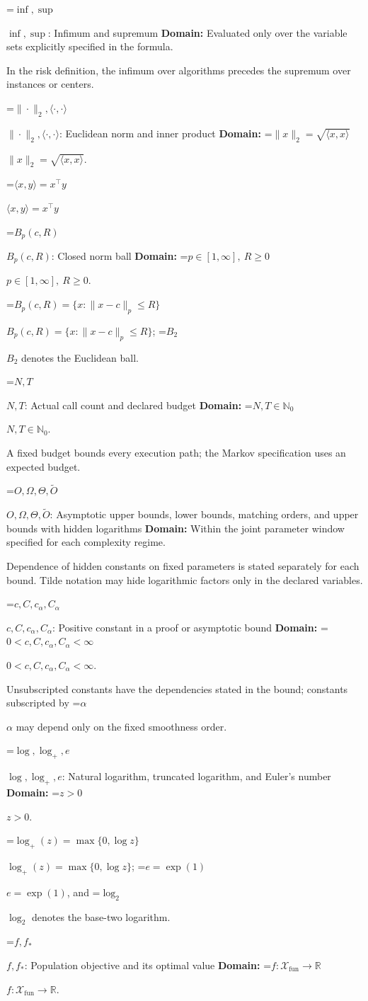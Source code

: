 \documentclass[10pt,a4paper]{article}
\newcommand{\AtlasMath}[1]{\par\begingroup\centering\setbox0=\hbox{$\displaystyle #1$}\ifdim\wd0>1.4\linewidth\typeout{ATLAS WIDE FORMULA: \the\wd0}\fi\ifdim\wd0>\linewidth\resizebox{\linewidth}{!}{\box0}\else\box0\fi\par\endgroup}
\newcommand{\AtlasInlineMath}[1]{\begingroup\setbox0=\hbox{$#1$}\ifdim\wd0>.4\linewidth\endgroup\AtlasMath{#1}\else\endgroup$#1$\fi}
\begin{document}
\AtlasInlineMath{\inf,\sup}: Infimum and supremum \textbf{Domain:} Evaluated only over the variable sets explicitly specified in the formula.

In the risk definition, the infimum over algorithms precedes the supremum over instances or centers.

\AtlasInlineMath{\|\cdot\|_2,\langle\cdot,\cdot\rangle}: Euclidean norm and inner product \textbf{Domain:} \AtlasInlineMath{\|x\|_2=\sqrt{\langle x,x\rangle}}.

\AtlasInlineMath{\langle x,y\rangle=x^\top y}

\AtlasInlineMath{B_p(c,R)}: Closed norm ball \textbf{Domain:} \AtlasInlineMath{p\in[1,\infty],\ R\ge0}.

\AtlasInlineMath{B_p(c,R)=\{x:\|x-c\|_p\le R\}}; \AtlasInlineMath{B_2} denotes the Euclidean ball.

\AtlasInlineMath{N,T}: Actual call count and declared budget \textbf{Domain:} \AtlasInlineMath{N,T\in\mathbb{N}_0}.

A fixed budget bounds every execution path; the Markov specification uses an expected budget.

\AtlasInlineMath{O,\Omega,\Theta,\widetilde{O}}: Asymptotic upper bounds, lower bounds, matching orders, and upper bounds with hidden logarithms \textbf{Domain:} Within the joint parameter window specified for each complexity regime.

Dependence of hidden constants on fixed parameters is stated separately for each bound. Tilde notation may hide logarithmic factors only in the declared variables.

\AtlasInlineMath{c,C,c_\alpha,C_\alpha}: Positive constant in a proof or asymptotic bound \textbf{Domain:} \AtlasInlineMath{0<c,C,c_\alpha,C_\alpha<\infty}.

Unsubscripted constants have the dependencies stated in the bound; constants subscripted by \AtlasInlineMath{\alpha} may depend only on the fixed smoothness order.

\AtlasInlineMath{\log,\log_+,e}: Natural logarithm, truncated logarithm, and Euler's number \textbf{Domain:} \AtlasInlineMath{z>0}.

\AtlasInlineMath{\log_+(z)=\max\{0,\log z\}}; \AtlasInlineMath{e=\exp(1)}, and \AtlasInlineMath{\log_2} denotes the base-two logarithm.

\AtlasInlineMath{f,f_*}: Population objective and its optimal value \textbf{Domain:} \AtlasInlineMath{f:\mathcal{X}_{\mathrm{fun}}\to\mathbb{R}}.
\end{document}
